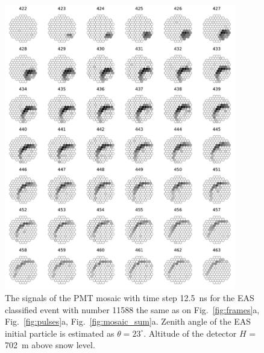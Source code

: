 \documentclass[final,5p,times,twocolumn]{elsarticle}
\begin{document}
\begin{figure}[pt]
    \centering
    \includegraphics[width=0.9\textwidth]{figs/mosaic_11588_log1.pdf}%
    \caption{The signals of the PMT mosaic with time step 12.5~ns for the EAS classified event with number 11588 the same as on Fig.~\ref{fig:frames}a, Fig.~\ref{fig:pulses}a, Fig.~\ref{fig:mosaic_sum}a. Zenith angle of the EAS initial particle is estimated as $\theta = 23^{\circ}$. Altitude of the detector $H$ = 702~m above snow level.
    }
    \label{fig:mosaic_eas2}
\end{figure}
\end{document}
